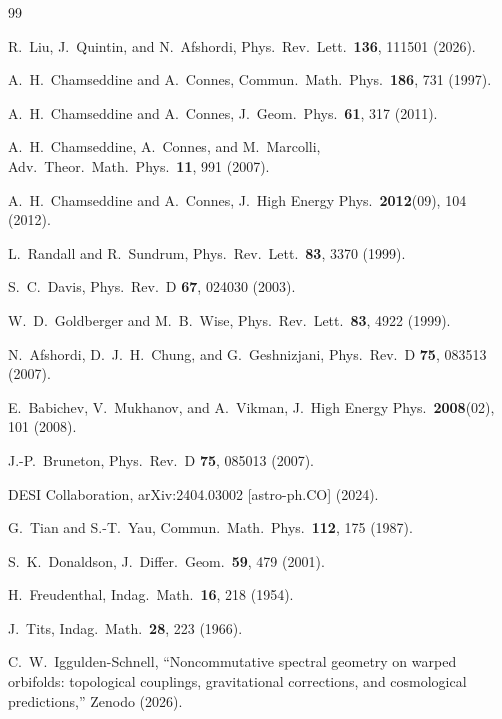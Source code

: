 \documentclass[aps,prl,twocolumn,superscriptaddress]{revtex4-2}
\begin{document}

\begin{thebibliography}{99}

R.~Liu, J.~Quintin, and N.~Afshordi,
Phys.\ Rev.\ Lett.\ \textbf{136}, 111501 (2026).

A.~H.~Chamseddine and A.~Connes,
Commun.\ Math.\ Phys.\ \textbf{186}, 731 (1997).

A.~H.~Chamseddine and A.~Connes,
J.\ Geom.\ Phys.\ \textbf{61}, 317 (2011).

A.~H.~Chamseddine, A.~Connes, and M.~Marcolli,
Adv.\ Theor.\ Math.\ Phys.\ \textbf{11}, 991 (2007).

A.~H.~Chamseddine and A.~Connes,
J.\ High Energy Phys.\ \textbf{2012}(09), 104 (2012).

L.~Randall and R.~Sundrum,
Phys.\ Rev.\ Lett.\ \textbf{83}, 3370 (1999).

S.~C.~Davis,
Phys.\ Rev.\ D \textbf{67}, 024030 (2003).

W.~D.~Goldberger and M.~B.~Wise,
Phys.\ Rev.\ Lett.\ \textbf{83}, 4922 (1999).

N.~Afshordi, D.~J.~H.~Chung, and G.~Geshnizjani,
Phys.\ Rev.\ D \textbf{75}, 083513 (2007).

E.~Babichev, V.~Mukhanov, and A.~Vikman,
J.\ High Energy Phys.\ \textbf{2008}(02), 101 (2008).

J.-P.~Bruneton,
Phys.\ Rev.\ D \textbf{75}, 085013 (2007).

DESI Collaboration,
arXiv:2404.03002 [astro-ph.CO] (2024).

G.~Tian and S.-T.~Yau,
Commun.\ Math.\ Phys.\ \textbf{112}, 175 (1987).

S.~K.~Donaldson,
J.\ Differ.\ Geom.\ \textbf{59}, 479 (2001).

H.~Freudenthal,
Indag.\ Math.\ \textbf{16}, 218 (1954).

J.~Tits,
Indag.\ Math.\ \textbf{28}, 223 (1966).

C.~W.~Iggulden-Schnell,
``Noncommutative spectral geometry on warped orbifolds:
topological couplings, gravitational corrections, and cosmological
predictions,'' Zenodo (2026).

\end{thebibliography}
\end{document}

